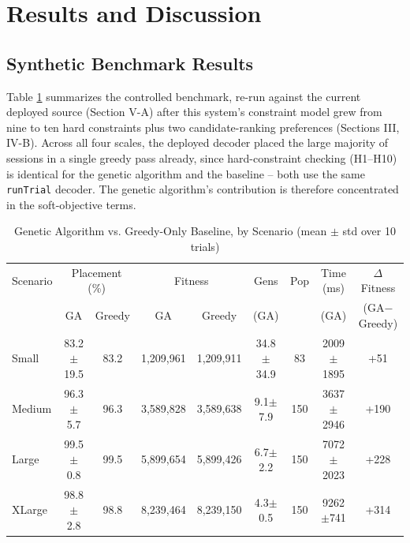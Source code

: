 \documentclass[conference]{IEEEtran}
\begin{document}
\section{Results and Discussion}

\subsection{Synthetic Benchmark Results}
Table \ref{tab:results} summarizes the controlled benchmark, re-run against the current deployed source (Section V-A) after this system's constraint model grew from nine to ten hard constraints plus two candidate-ranking preferences (Sections III, IV-B). Across all four scales, the deployed decoder placed the large majority of sessions in a single greedy pass already, since hard-constraint checking (H1--H10) is identical for the genetic algorithm and the baseline -- both use the same \texttt{runTrial} decoder. The genetic algorithm's contribution is therefore concentrated in the soft-objective terms.

\begin{table}[t]
\caption{Genetic Algorithm vs. Greedy-Only Baseline, by Scenario (mean $\pm$ std over 10 trials)}
\label{tab:results}
\centering
\small
\begin{tabular}{lcccccccc}
\toprule
Scenario & \multicolumn{2}{c}{Placement (\%)} & \multicolumn{2}{c}{Fitness} & Gens & Pop & Time (ms) & $\Delta$Fitness \\
& GA & Greedy & GA & Greedy & (GA) & & (GA) & (GA$-$Greedy) \\
\midrule
Small & 83.2$\pm$19.5 & 83.2 & 1,209,961 & 1,209,911 & 34.8$\pm$34.9 & 83 & 2009$\pm$1895 & +51 \\
Medium & 96.3$\pm$5.7 & 96.3 & 3,589,828 & 3,589,638 & 9.1$\pm$7.9 & 150 & 3637$\pm$2946 & +190 \\
Large & 99.5$\pm$0.8 & 99.5 & 5,899,654 & 5,899,426 & 6.7$\pm$2.2 & 150 & 7072$\pm$2023 & +228 \\
XLarge & 98.8$\pm$2.8 & 98.8 & 8,239,464 & 8,239,150 & 4.3$\pm$0.5 & 150 & 9262$\pm$741 & +314 \\
\bottomrule
\end{tabular}
\end{table}
\end{document}
